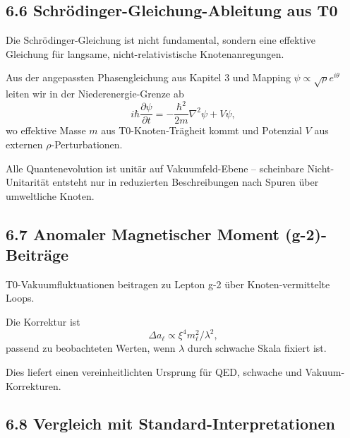 \documentclass[12pt,a4paper]{article}
\begin{document}
	\subsection{6.6 Schrödinger-Gleichung-Ableitung aus T0}
	
	Die Schrödinger-Gleichung ist nicht fundamental, sondern eine effektive Gleichung für langsame, nicht-relativistische Knotenanregungen.
	
	Aus der angepassten Phasengleichung aus Kapitel 3 und Mapping $\psi \propto \sqrt{\rho} e^{i\theta}$ leiten wir in der Niederenergie-Grenze ab
	\[
	i \hbar \frac{\partial \psi}{\partial t} = -\frac{\hbar^2}{2m} \nabla^2 \psi + V \psi,
	\]
	wo effektive Masse $m$ aus T0-Knoten-Trägheit kommt und Potenzial $V$ aus externen $\rho$-Perturbationen.
	
	Alle Quantenevolution ist unitär auf Vakuumfeld-Ebene – scheinbare Nicht-Unitarität entsteht nur in reduzierten Beschreibungen nach Spuren über umweltliche Knoten.
	
	\subsection{6.7 Anomaler Magnetischer Moment (g-2)-Beiträge}
	
	T0-Vakuumfluktuationen beitragen zu Lepton g-2 über Knoten-vermittelte Loops.
	
	Die Korrektur ist
	\[
	\Delta a_\ell \propto \xi^4 m_\ell^2 / \lambda^2,
	\]
	passend zu beobachteten Werten, wenn $\lambda$ durch schwache Skala fixiert ist.
	
	Dies liefert einen vereinheitlichten Ursprung für QED, schwache und Vakuum-Korrekturen.
	
	\subsection{6.8 Vergleich mit Standard-Interpretationen}
	
	\begin{table}[htbp]
		\centering
		\caption{Quanteninterpretation-Vergleich}
		\label{tab:quanten}
	\end{table}
	
\end{document}
